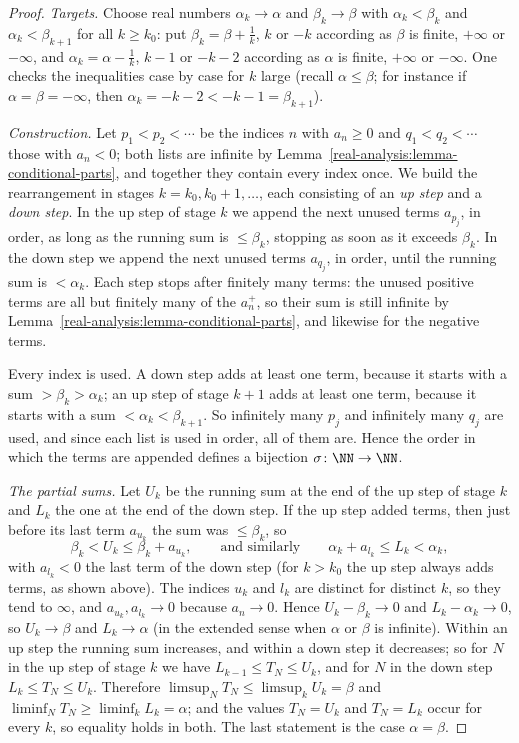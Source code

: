 \begin{proof}
\emph{Targets.} Choose real numbers $\alpha_k \to \alpha$ and $\beta_k \to \beta$ with $\alpha_k < \beta_k$ and $\alpha_k < \beta_{k+1}$ for all $k \geq k_0$: put $\beta_k = \beta + \frac1k$, $k$ or $-k$
according as $\beta$ is finite, $+\infty$ or $-\infty$, and $\alpha_k = \alpha - \frac1k$, $k - 1$ or $-k - 2$ according as $\alpha$ is finite, $+\infty$ or $-\infty$. One checks the inequalities case by
case for $k$ large (recall $\alpha \leq \beta$; for instance if $\alpha = \beta = -\infty$, then $\alpha_k = -k - 2 < -k - 1 = \beta_{k+1}$).

\emph{Construction.} Let $p_1 < p_2 < \cdots$ be the indices $n$ with $a_n \geq 0$ and $q_1 < q_2 < \cdots$ those with $a_n < 0$; both lists are infinite by
Lemma~\ref{real-analysis:lemma-conditional-parts}, and together they contain every index once. We build the rearrangement in stages $k = k_0, k_0 + 1, \ldots$, each consisting of an \emph{up step} and
a \emph{down step}. In the up step of stage $k$ we append the next unused terms $a_{p_j}$, in order, as long as the running sum is $\leq \beta_k$, stopping as soon as it exceeds $\beta_k$. In the down step
we append the next unused terms $a_{q_j}$, in order, until the running sum is $< \alpha_k$. Each step stops after finitely many terms: the unused positive terms are all but finitely many of the $a_n^+$,
so their sum is still infinite by Lemma~\ref{real-analysis:lemma-conditional-parts}, and likewise for the negative terms.

Every index is used. A down step adds at least one term, because it starts with a sum $> \beta_k > \alpha_k$; an up step of stage $k + 1$ adds at least one term, because it starts with a sum
$< \alpha_k < \beta_{k+1}$. So infinitely many $p_j$ and infinitely many $q_j$ are used, and since each list is used in order, all of them are. Hence the order in which the terms are appended defines a
bijection $\sigma \colon \NN \to \NN$.

\emph{The partial sums.} Let $U_k$ be the running sum at the end of the up step of stage $k$ and $L_k$ the one at the end of the down step. If the up step added terms, then just before its last term
$a_{u_k}$ the sum was $\leq \beta_k$, so
\[
\beta_k < U_k \leq \beta_k + a_{u_k}, \qquad\text{and similarly}\qquad \alpha_k + a_{l_k} \leq L_k < \alpha_k,
\]
with $a_{l_k} < 0$ the last term of the down step (for $k > k_0$ the up step always adds terms, as shown above). The indices $u_k$ and $l_k$ are distinct for distinct $k$, so they tend to $\infty$, and
$a_{u_k}, a_{l_k} \to 0$ because $a_n \to 0$. Hence $U_k - \beta_k \to 0$ and $L_k - \alpha_k \to 0$, so $U_k \to \beta$ and $L_k \to \alpha$ (in the extended sense when $\alpha$ or $\beta$ is
infinite). Within an up step the running sum increases, and within a down step it decreases; so for $N$ in the up step of stage $k$ we have $L_{k-1} \leq T_N \leq U_k$, and for $N$ in the down step
$L_k \leq T_N \leq U_k$. Therefore $\limsup_NT_N \leq \limsup_kU_k = \beta$ and $\liminf_NT_N \geq \liminf_kL_k = \alpha$; and the values $T_N = U_k$ and $T_N = L_k$ occur for every $k$, so
equality holds in both. The last statement is the case $\alpha = \beta$.
\end{proof}

